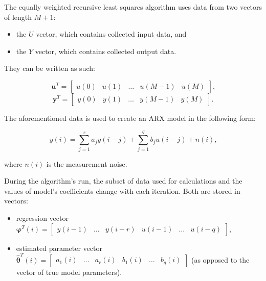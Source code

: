 \documentclass[12pt,a4paper]{article}
\begin{document}
\bigskip\noindent

The equally weighted recursive least squares algorithm uses data from two 
vectors of length $M+1$:
\begin{itemize}
\item the $U$ vector, which contains collected input data, and 
\item the $Y$ vector, which contains collected output data.
\end{itemize}

They can be written as such:

\begin{equation*}
\bm{u}^{T} = \begin{bmatrix} u(0) & u(1) & \dots & u(M-1) & u(M) \end{bmatrix} \text{,}
\end{equation*}
\begin{equation*}
\bm{y}^{T} = \begin{bmatrix} y(0) & y(1) & \dots & y(M-1) & y(M) \end{bmatrix} \text{.}
\end{equation*}

The aforementioned data is used to create an ARX model in the following form: 

\begin{equation*}
y(i) = \sum_{j = 1}^{r} a_{j}y(i-j) + \sum_{j = 1}^{q} b_{j}u(i-j) + n(i) \text{,}
\end{equation*}

where $n(i)$ is the measurement noise. 

During the algorithm's run, the subset of data used for calculations and the values of model's coefficients change with each iteration. Both are stored in vectors:
\begin{itemize} 
\item regression vector $\bm{\varphi}^{T}(i) = \begin{bmatrix} y(i-1) & \dots & y(i-r) & u(i-1) & \dots & u(i-q) \end{bmatrix}$,
\item estimated parameter vector $\hat{\bm{\theta}}^{T}(i) = \begin{bmatrix} a_{1}(i) & \dots & a_{r}(i) & b_{1}(i) & \dots & b_{q}(i) \end{bmatrix}$ (as opposed to the vector of true model parameters).
\end{itemize}
\end{document}
